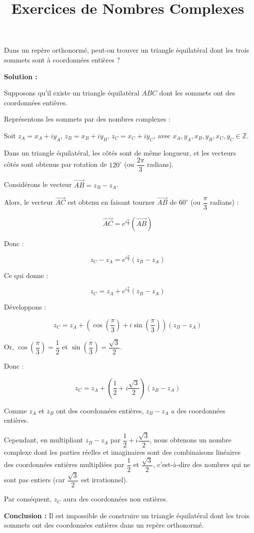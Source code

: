 \documentclass[a4paper,12pt]{article}
\title{Exercices de Nombres Complexes}
\author{}
\date{}
\begin{document}
\begin{tcolorbox}[title={Exercice 17 - {[}Représenter, Calculer, Chercher{]}}]
Dans un repère orthonormé, peut-on trouver un triangle équilatéral dont les trois sommets sont à coordonnées entières ?
\end{tcolorbox}

\begin{solutionbox}
\textbf{Solution :}

Supposons qu'il existe un triangle équilatéral \( ABC \) dont les sommets ont des coordonnées entières.

Représentons les sommets par des nombres complexes :

Soit \( z_A = x_A + i y_A \), \( z_B = x_B + i y_B \), \( z_C = x_C + i y_C \), avec \( x_A, y_A, x_B, y_B, x_C, y_C \in \mathbb{Z} \).

Dans un triangle équilatéral, les côtés sont de même longueur, et les vecteurs côtés sont obtenus par rotation de \( 120^\circ \) (ou \( \dfrac{2\pi}{3} \) radians).

Considérons le vecteur \( \overrightarrow{AB} = z_B - z_A \).

Alors, le vecteur \( \overrightarrow{AC} \) est obtenu en faisant tourner \( \overrightarrow{AB} \) de \( 60^\circ \) (ou \( \dfrac{\pi}{3} \) radians) :

\[
\overrightarrow{AC} = e^{i\frac{\pi}{3}} (\overrightarrow{AB})
\]

Donc :

\[
z_C - z_A = e^{i\frac{\pi}{3}} (z_B - z_A)
\]

Ce qui donne :

\[
z_C = z_A + e^{i\frac{\pi}{3}} (z_B - z_A)
\]

Développons :

\[
z_C = z_A + \left( \cos\left( \dfrac{\pi}{3} \right) + i \sin\left( \dfrac{\pi}{3} \right) \right) (z_B - z_A)
\]

Or, \( \cos\left( \dfrac{\pi}{3} \right) = \dfrac{1}{2} \) et \( \sin\left( \dfrac{\pi}{3} \right) = \dfrac{\sqrt{3}}{2} \).

Donc :

\[
z_C = z_A + \left( \dfrac{1}{2} + i \dfrac{\sqrt{3}}{2} \right) (z_B - z_A)
\]

Comme \( z_A \) et \( z_B \) ont des coordonnées entières, \( z_B - z_A \) a des coordonnées entières.

Cependant, en multipliant \( z_B - z_A \) par \( \dfrac{1}{2} + i \dfrac{\sqrt{3}}{2} \), nous obtenons un nombre complexe dont les parties réelles et imaginaires sont des combinaisons linéaires des coordonnées entières multipliées par \( \dfrac{1}{2} \) et \( \dfrac{\sqrt{3}}{2} \), c'est-à-dire des nombres qui ne sont pas entiers (car \( \dfrac{\sqrt{3}}{2} \) est irrationnel).

Par conséquent, \( z_C \) aura des coordonnées non entières.

\textbf{Conclusion :} Il est impossible de construire un triangle équilatéral dont les trois sommets ont des coordonnées entières dans un repère orthonormé.

\end{solutionbox}
\end{document}
